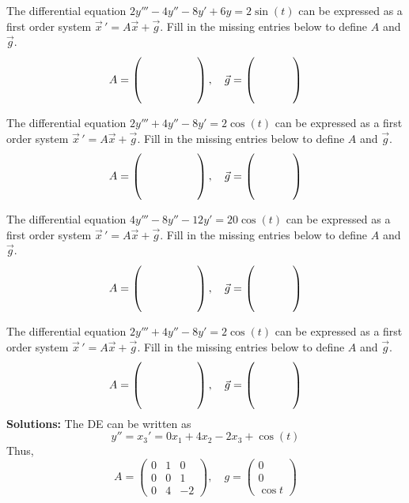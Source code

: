 \ifnum {}

\question[2] The differential equation $2y'''-4y''-8y'+6y=2\sin(t)$ can be expressed as a first order system $\vec x \, ' = A \vec x + \vec g$. Fill in the missing entries below to define $A$ and $\vec g$.  
\begin{align*}
 A = \left( \hbox to 1.75cm{\vbox to 0.85cm{}} \right), \quad \vec g = \left( \hbox to 1.2cm{\vbox to 0.85cm{}} \right)
\end{align*}    

\fi 

\ifnum {}
\question[2] The differential equation $2y'''+4y''-8y' =2\cos(t)$ can be expressed as a first order system $\vec x \, ' = A \vec x + \vec g$. Fill in the missing entries below to define $A$ and $\vec g$.  
 \begin{align*}
     A = \left( \hbox to 1.75cm{\vbox to 0.85cm{}} \right), \quad \vec g = \left( \hbox to 1.2cm{\vbox to 0.85cm{}} \right)
 \end{align*}  
\fi 


\ifnum {}
\question[2] The differential equation $4y'''- 8 y''-12y'=20\cos(t)$ can be expressed as a first order system $\vec x \, ' = A \vec x + \vec g$. Fill in the missing entries below to define $A$ and $\vec g$.  
 \begin{align*}
     A = \left( \hbox to 1.75cm{\vbox to 0.85cm{}} \right), \quad \vec g = \left( \hbox to 1.2cm{\vbox to 0.85cm{}} \right)
 \end{align*}  
\fi 




\ifnum {}
\question[2] The differential equation $2y'''+4y''-8y'=2\cos(t)$ can be expressed as a first order system $\vec x \, ' = A \vec x + \vec g$. Fill in the missing entries below to define $A$ and $\vec g$.  
 \begin{align*}
     A = \left( \hbox to 1.75cm{\vbox to 0.85cm{}} \right), \quad \vec g = \left( \hbox to 1.2cm{\vbox to 0.85cm{}} \right)
 \end{align*}  
 \ifnum {} {\color{DarkBlue} 
\textbf{Solutions:}
The DE can be written as
$$y'' = x_3 ' = 0x_1 +4x_2 - 2x_3 + \cos(t)$$
Thus,
$$A = \begin{pmatrix} 0&1&0\\0&0&1\\0&4&-2\end{pmatrix}, \quad g = \begin{pmatrix} 0\\0\\\cos t\end{pmatrix}$$
} 
\else 
\newpage
\fi
\fi 


